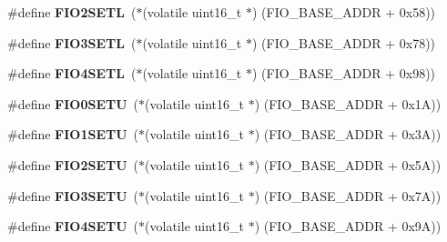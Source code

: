 \begin{DoxyCompactItemize}
\item 
\mbox{\label{group__lpc24xx__regs_ga840aa85de19531e7c47bc0ee5e4644de}} 
\#define {\bfseries F\+I\+O2\+S\+E\+TL}~($\ast$(volatile uint16\+\_\+t $\ast$) (F\+I\+O\+\_\+\+B\+A\+S\+E\+\_\+\+A\+D\+DR + 0x58))
\item 
\mbox{\label{group__lpc24xx__regs_ga364fdcf0bcb079b2f435990518a7ae5c}} 
\#define {\bfseries F\+I\+O3\+S\+E\+TL}~($\ast$(volatile uint16\+\_\+t $\ast$) (F\+I\+O\+\_\+\+B\+A\+S\+E\+\_\+\+A\+D\+DR + 0x78))
\item 
\mbox{\label{group__lpc24xx__regs_ga233be106289eb89c3fcf6a1518fea702}} 
\#define {\bfseries F\+I\+O4\+S\+E\+TL}~($\ast$(volatile uint16\+\_\+t $\ast$) (F\+I\+O\+\_\+\+B\+A\+S\+E\+\_\+\+A\+D\+DR + 0x98))
\item 
\mbox{\label{group__lpc24xx__regs_ga92e5572cceb6757704b53729547db273}} 
\#define {\bfseries F\+I\+O0\+S\+E\+TU}~($\ast$(volatile uint16\+\_\+t $\ast$) (F\+I\+O\+\_\+\+B\+A\+S\+E\+\_\+\+A\+D\+DR + 0x1\+A))
\item 
\mbox{\label{group__lpc24xx__regs_ga4fff0fd5c35a6e1874d71088d625e9c5}} 
\#define {\bfseries F\+I\+O1\+S\+E\+TU}~($\ast$(volatile uint16\+\_\+t $\ast$) (F\+I\+O\+\_\+\+B\+A\+S\+E\+\_\+\+A\+D\+DR + 0x3\+A))
\item 
\mbox{\label{group__lpc24xx__regs_gaece476bc2b739e0a58231cc29d320da6}} 
\#define {\bfseries F\+I\+O2\+S\+E\+TU}~($\ast$(volatile uint16\+\_\+t $\ast$) (F\+I\+O\+\_\+\+B\+A\+S\+E\+\_\+\+A\+D\+DR + 0x5\+A))
\item 
\mbox{\label{group__lpc24xx__regs_gadaa0b534b773dc8f552cffd4be06e800}} 
\#define {\bfseries F\+I\+O3\+S\+E\+TU}~($\ast$(volatile uint16\+\_\+t $\ast$) (F\+I\+O\+\_\+\+B\+A\+S\+E\+\_\+\+A\+D\+DR + 0x7\+A))
\item 
\mbox{\label{group__lpc24xx__regs_ga6314e5dcf627a67811002f769bcbd5ea}} 
\#define {\bfseries F\+I\+O4\+S\+E\+TU}~($\ast$(volatile uint16\+\_\+t $\ast$) (F\+I\+O\+\_\+\+B\+A\+S\+E\+\_\+\+A\+D\+DR + 0x9\+A))
\item 

\end{DoxyCompactItemize}
